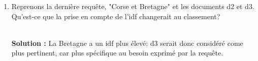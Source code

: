 \documentclass[11pt,a4paper]{article}
\newenvironment{solution}[0]{
~\\ \color{red} \textbf{Solution : }\color{black}}{%
}
\begin{document}
\begin{enumerate}
\begin{solution}
\begin{itemize}
       d4 est premier car il mentionne deux fois la Normandie.
  
  \item Alsace et Corse 
  
    d1 : $\frac{2+1}{\sqrt{5}}$; 
    d2 : $\frac{1+1}{2}$;
     d4 : $\frac{1}{\sqrt{5}}$; 
    
    d1 est premier comme on pouvait s'y attendre: il parle exclusivement
    de la Corse et de l'Alsace. Viennent ensuite d2 puis d4.
    
  \item Corse et Bretagne.
  
    d1 : $\frac{1}{\sqrt{5}}$; 
    d2 : $\frac{2}{2}$;
    d3 :  $\frac{1}{1}$  
    d4 :  $\frac{1}{\sqrt{5}}$  
    
  d2 et d3 arrivent à égalité. Intuitivement, il parlent tous les deux "à moitié"
   de Corse et de Bretagne.  d1 et d4 parlent de Corse \emph{ou} de Bretagne et aussi des autres
    pays.
 \end{itemize}

\end{solution}  
    
    \item Reprenons la dernière requête, "Corse et Bretagne" et les documents d2 et d3.
       Qu'est-ce que la prise en compte de l'idf changerait au classement?
    
\begin{solution}
La Bretagne a un idf plus élevé: d3 serait donc considéré come plus pertinent, 
car plus spécifique au besoin exprimé par la requête.
\end{solution}

  \end{enumerate}
\end{document}
